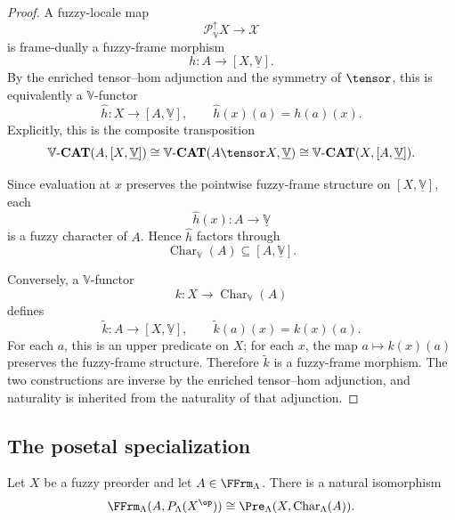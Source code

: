 \begin{proof}
A fuzzy-locale map
\[
    \mathcal P_{\mathbb V}^{\uparrow}X\to\mathcal X
\]
is frame-dually a fuzzy-frame morphism
\[
    h:A\to [X,\underline{\mathbb V}].
\]
By the enriched tensor--hom adjunction and the symmetry of \(\tensor\), this is
equivalently a \(\mathbb V\)-functor
\[
    \widehat h:X\to [A,\underline{\mathbb V}],
    \qquad
    \widehat h(x)(a)=h(a)(x).
\]
Explicitly, this is the composite transposition
\[
    \mathbb V\text{-}\mathbf{CAT}(A,[X,\underline{\mathbb V}])
    \cong
    \mathbb V\text{-}\mathbf{CAT}(A\tensor X,\underline{\mathbb V})
    \cong
    \mathbb V\text{-}\mathbf{CAT}(X,[A,\underline{\mathbb V}]).
\]

Since evaluation at \(x\) preserves the pointwise fuzzy-frame structure on
\([X,\underline{\mathbb V}]\), each
\[
    \widehat h(x):A\to\underline{\mathbb V}
\]
is a fuzzy character of \(A\).  Hence \(\widehat h\) factors through
\[
    \operatorname{Char}_{\mathbb V}(A)
    \subseteq
    [A,\underline{\mathbb V}].
\]

Conversely, a \(\mathbb V\)-functor
\[
    k:X\to\operatorname{Char}_{\mathbb V}(A)
\]
defines
\[
    \widetilde k:A\to[X,\underline{\mathbb V}],
    \qquad
    \widetilde k(a)(x)=k(x)(a).
\]
For each \(a\), this is an upper predicate on \(X\); for each \(x\), the map
\(a\mapsto k(x)(a)\) preserves the fuzzy-frame structure.  Therefore
\(\widetilde k\) is a fuzzy-frame morphism.  The two constructions are inverse by
the enriched tensor--hom adjunction, and naturality is inherited from the
naturality of that adjunction.
\end{proof}

\subsection{The posetal specialization}
\label{subsec:upper-character-adjunction-posetal}

\begin{theorem}
\label{thm:upper-fuzzy-character-adjunction-posetal}
Let \(X\) be a fuzzy preorder and let \(A\in\FFrm_\Lambda\).  There is a natural
isomorphism
\[
    \FFrm_\Lambda(A,P_\Lambda(X^{\op}))
    \cong
    \Pre_\Lambda(X,\operatorname{Char}_\Lambda(A)).
\]
\end{theorem}

